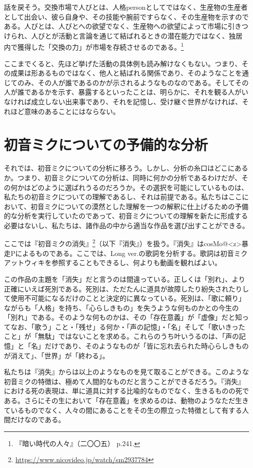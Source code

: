 \documentclass[b5j,twoside,twocolumn]{utarticle}
\begin{document}
話を戻そう。交換市場で人びとは、人格personとしてではなく、生産物の生産者として出会い、彼ら自身や、その技能や腕前ですらなく、その生産物を示すのである。人びとは、人びとへの欲望でなく、生産物への欲望によって市場に引きつけられ、人びとが活動と言論を通じて結ばれるときの潜在能力ではなく、独居内で獲得した「交換の力」が市場を存続させるのである。\footnote{『暗い時代の人々』（二〇〇五） p.241.}


ここまでくると、先ほど挙げた活動の具体例も読み解けなくもない。つまり、その成果は形あるものではなく、他人と結ばれる関係であり、そのようなことを通じてのみ、その人が誰であるのかが示されるようなものなのである。そしてその人が誰であるかを示す、暴露するといったことは、明らかに、それを観る人がいなければ成立しない出来事であり、それを記憶し、受け継ぐ世界がなければ、それほど意味のあることにはならない。


\section{初音ミクについての予備的な分析}
それでは、初音ミクについての分析に移ろう。しかし、分析の糸口はどこにあるか。つまり、初音ミクについての分析は、同時に何かの分析であるわけだが、その何かはどのように選ばれうるのだろうか。その選択を可能にしているものは、私たちの初音ミクについての理解であるし、それは前提である。私たちはここにおいて、初音ミクについての漠然とした理解を一つの解釈に仕上げるための予備的な分析を実行していたのであって、初音ミクについての理解を新たに形成する必要はないし、私たちは、諸作品の中から適当な作品を選び出すことができる。


ここでは『初音ミクの消失』\footnote{\url{https://www.nicovideo.jp/watch/sm2937784}}（以下『消失』）を扱う。『消失』はcosMo@\pbox<z>{暴走}Pによるものである。ここでは、Long ver.の歌詞を分析する。歌詞は初音ミクアットウィキを参照することもできるし、何よりも動画を観ればよい。


この作品の主題を「消失」だと言うのは間違っている。正しくは「別れ」、より正確にいえば死別である。死別は、ただたんに道具が故障したり紛失されたりして使用不可能になるだけのことと決定的に異なっている。死別は、「歌に頼り」ながらも「人格」を持ち、「心らしきもの」を失うような何ものかとの今生の「別れ」である。そのような何ものかは、その「存在意義」が「虚像」だと知ってなお、「歌う」こと・「残せ」る何か・「声の記憶」・「名」そして「歌いきったこと」が「無駄」ではないことを求める。これらのうち叶いうるのは、「声の記憶」と「名」だけであり、そのようなものが「皆に忘れ去られた時心らしきものが消えて」、「世界」が「終わる」。


私たちは『消失』からは以上のようなものを見て取ることができる。このような初音ミクの特徴は、極めて人間的なものだと言うことができるだろう。『消失』における死の表現は、単に道具に対する比喩的なものでなく、生きるものの死である。さらにその生において「存在意義」を求めるのは、動物のようなただ生きているものでなく、人々の間にあることをその生の際立った特徴として有する人間だけなのである。
\end{document}
